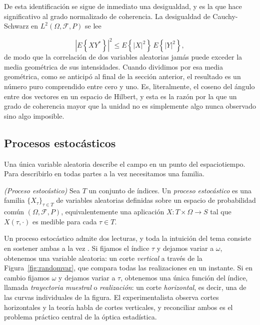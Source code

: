 		De esta identificación se sigue de inmediato una desigualdad, y es la que hace significativo al grado normalizado de coherencia. La desigualdad de Cauchy-Schwarz en $L^{2}(\Omega,\mathcal{F},P)$ se lee

		\begin{equation}\label{eq:CauchySchwarzProb}
			\left|E\left\{XY^{*}\right\}\right|^{2} \leq E\left\{|X|^{2}\right\}\,E\left\{|Y|^{2}\right\},
		\end{equation}
		de modo que la correlación de dos variables aleatorias jamás puede exceder la media geométrica de sus intensidades. Cuando dividimos por esa media geométrica, como se anticipó al final de la sección anterior, el resultado es un número puro comprendido entre cero y uno. Es, literalmente, el coseno del ángulo entre dos vectores en un espacio de Hilbert, y esta es la razón por la que un grado de coherencia mayor que la unidad no es simplemente algo nunca observado sino algo imposible.

	\subsection{Procesos estocásticos}

		Una única variable aleatoria describe el campo en un punto del espaciotiempo. Para describirlo en todas partes a la vez necesitamos una familia.

		\begin{myDef}
			\textit{(Proceso estocástico)} Sea $T$ un conjunto de índices. Un \textit{proceso estocástico} es una familia $\{X_{\tau}\}_{\tau\in T}$ de variables aleatorias definidas sobre un espacio de probabilidad común $(\Omega,\mathcal{F},P)$, equivalentemente una aplicación $X:T\times\Omega\to S$ tal que $X(\tau,\cdot)$ es medible para cada $\tau\in T$.
		\end{myDef}

		Un proceso estocástico admite dos lecturas, y toda la intuición del tema consiste en sostener ambas a la vez \citep{doob1953stochastic}. Si fijamos el índice $\tau$ y dejamos variar a $\omega$, obtenemos una variable aleatoria: un corte \textit{vertical} a través de la Figura~\ref{fig:randomvar}, que compara todas las realizaciones en un instante. Si en cambio fijamos $\omega$ y dejamos variar a $\tau$, obtenemos una única función del índice, llamada \textit{trayectoria muestral} o \textit{realización}: un corte \textit{horizontal}, es decir, una de las curvas individuales de la figura. El experimentalista observa cortes horizontales y la teoría habla de cortes verticales, y reconciliar ambos es el problema práctico central de la óptica estadística.


